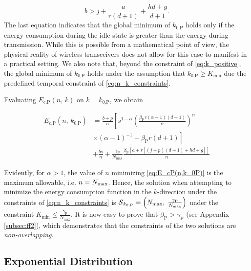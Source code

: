 \documentclass[twocolumn,english]{IEEEtran}
\theoremstyle{plain}
\theoremstyle{definition}
\begin{document}
\noindent 
\begin{equation}
b>j+\frac{a}{r(d+1)}+\frac{hd+g}{d+1}.\label{eq:k_positive}
\end{equation}
The last equation indicates that the global minimum of $k_{\text{0,P}}$
holds only if the energy consumption during the idle state is greater
than the energy during transmission. While this is possible from a
mathematical point of view, the physical reality of wireless transceivers
does not allow for this case to manifest in a practical setting. We
also note that, beyond the constraint of \eqref{eq:k_positive}, the
global minimum of $k_{\text{0,P}}$ holds under the assumption that
$k_{\text{0,P}}\geq K_{\min}$ due the predefined temporal constraint
of \eqref{eq:n_k_constraints}.

\noindent Evaluating $E_{\text{c,P}}(n,\, k)$ on $k=k_{\text{0,P}}$,
we obtain

\begin{align}
E_{\text{c,P}}(n,\, k_{\text{0,P}}) & =\frac{b+p}{n}\left[s^{1-\alpha}\left(\frac{\beta_{\textrm{P}}r(\alpha-1)(d+1)}{\alpha}\right)^{\alpha}\right.\nonumber \\
 & \times\left.\left(\alpha-1\right)^{-1}-\beta_{\textrm{P}}r\left(d+1\right)\right]\label{eq:E_cP(n,k_0P)}\\
 & +\frac{bs}{n}+\frac{\gamma_{\textrm{P}}}{N_{\text{max}}}\frac{\beta_{\textrm{P}}\left[a+r\left[\left(j+p\right)\left(d+1\right)+hd+g\right]\right]}{n}\nonumber 
\end{align}


\noindent Evidently, for $\alpha>1$, the value of $n$ minimizing
\eqref{eq:E_cP(n,k_0P)} is the maximum allowable, i.e. $n=N_{\textnormal{max}}$.
Hence, the solution when attempting to minimize the energy consumption
function in the $k$-direction under the constraints of \eqref{eq:n_k_constraints}
is $\text{\ensuremath{\mathcal{S}}}_{k_{0,\text{P}}}=\left(N_{\text{max}},\;\frac{\gamma_{\textrm{P}}}{N_{\text{max}}}\right)$
under the constraint $K_{\min}\leq\frac{\gamma_{\textrm{P}}}{N_{\textrm{max}}}$.
It is now easy to prove that $\beta_{\text{P}}>\gamma_{\textrm{P}}$
(see Appendix \ref{subsec:ff2}), which demonstrates that the constraints
of the two solutions are \emph{non-overlapping}.


\subsection{Exponential Distribution\label{sub:Appendix-Exponential}}
\end{document}
